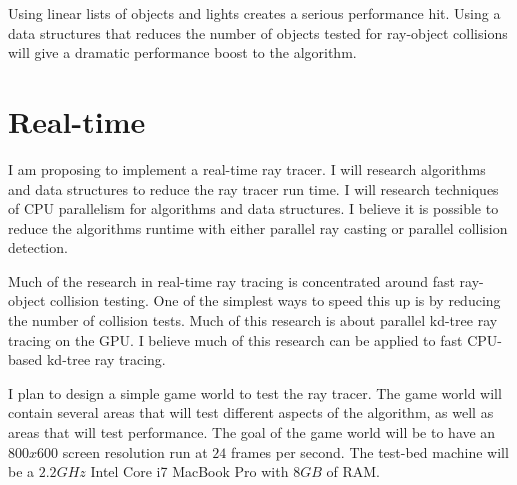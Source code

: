 \documentclass[11pt,a4paper,oneside]{article}
\begin{document}
Using linear lists of objects and lights creates a serious performance hit.  Using a data structures that reduces the number of objects tested for ray-object collisions will give a dramatic performance boost to the algorithm.


\section{Real-time}
I am proposing to implement a real-time ray tracer.  I will research algorithms and data structures to reduce the ray tracer run time.  I will research techniques of CPU parallelism for algorithms and data structures.  I believe it is possible to reduce the algorithms runtime with either parallel ray casting or parallel collision detection.

Much of the research in real-time ray tracing is concentrated around fast ray-object collision testing.  One of the simplest ways to speed this up is by reducing the number of collision tests\cite{kd:2005}.
Much of this research is about parallel kd-tree ray tracing on the GPU\cite{kd:2007}\cite{fkd:2007}.  I believe much of this research can be applied to fast CPU-based kd-tree ray tracing\cite{kd:2006}.

I plan to design a simple game world to test the ray tracer.  The game world will contain several areas that will test different aspects of the algorithm, as well as areas that will test performance.  The goal of the game world will be to have an $800x600$ screen resolution run at $24$ frames per second.  The test-bed machine will be a $2.2 GHz$ Intel Core i7 MacBook Pro with $8GB$ of RAM.  

\newpage
\listofalgorithms
\listoffigures


\end{document}
